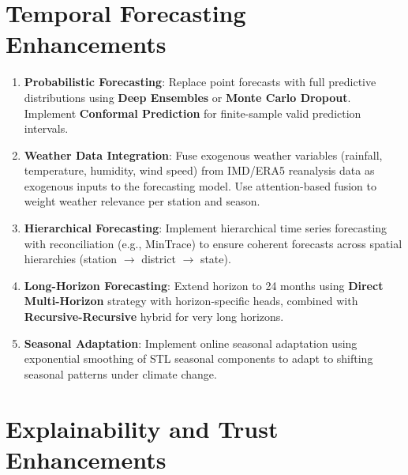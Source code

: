 \documentclass[12pt,a4paper]{report}
\numberwithin{table}{chapter}
\numberwithin{figure}{chapter}
\begin{document}
\section{Temporal Forecasting Enhancements}

\begin{enumerate}[leftmargin=1.5cm,itemsep=0pt,topsep=2pt,parsep=0pt,partopsep=0pt]
  \item \textbf{Probabilistic Forecasting}: Replace point forecasts with full predictive
    distributions using \textbf{Deep Ensembles} or \textbf{Monte Carlo Dropout}.
    Implement \textbf{Conformal Prediction} for finite-sample valid prediction intervals.

  \item \textbf{Weather Data Integration}: Fuse exogenous weather variables (rainfall,
    temperature, humidity, wind speed) from IMD/ERA5 reanalysis data as exogenous
    inputs to the forecasting model. Use attention-based fusion to weight weather
    relevance per station and season.

  \item \textbf{Hierarchical Forecasting}: Implement hierarchical time series
    forecasting with reconciliation (e.g., MinTrace) to ensure coherent forecasts
    across spatial hierarchies (station $\rightarrow$ district $\rightarrow$ state).

  \item \textbf{Long-Horizon Forecasting}: Extend horizon to 24 months using
    \textbf{Direct Multi-Horizon} strategy with horizon-specific heads, combined with
    \textbf{Recursive-Recursive} hybrid for very long horizons.

  \item \textbf{Seasonal Adaptation}: Implement online seasonal adaptation using
    exponential smoothing of STL seasonal components to adapt to shifting seasonal
    patterns under climate change.
\end{enumerate}

\section{Explainability and Trust Enhancements}
\end{document}

